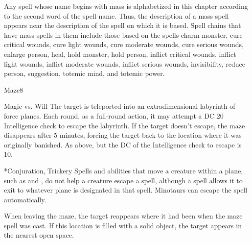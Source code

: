 \par Any spell whose name begins with mass is alphabetized in this chapter according to the second word of the spell name. Thus, the description of a mass spell appears near the description of the spell on which it is based. Spell chains that have mass spells in them include those based on the spells charm monster, cure critical wounds, cure light wounds, cure moderate wounds, cure serious wounds, enlarge person, heal, hold monster, hold person, inflict critical wounds, inflict light wounds, inflict moderate wounds, inflict serious wounds, invisibility, reduce person, suggestion, totemic mind, and totemic power.

\begin{spellsection}{Maze}{8}
    \begin{spellheader}
    \end{spellheader}
    \begin{spellcontent}
        \begin{spelltargetinginfo}
        \end{spelltargetinginfo}
        \begin{spelleffects}
            \begin{spellattack}{Magic vs. Will}
                \spellsuccess The target is teleported into an extradimensional labyrinth of force planes. Each round, as a full-round action, it may attempt a DC 20 Intelligence check to escape the labyrinth. If the target doesn't escape, the maze disappears after 5 minutes, forcing the target back to the location where it was originally banished.
                \spellfailure As above, but the DC of the Intelligence check to escape is 10.
            \end{spellattack}
        \end{spelleffects}
    \end{spellcontent}
    \begin{spellfooter}
        *{Conjuration, Trickery}
        \spellnotes Spells and abilities that move a creature within a plane, such as  and , do not help a creature escape a  spell, although a  spell allows it to exit to whatever plane is designated in that spell. Minotaurs can escape the spell automatically.

        When leaving the maze, the target reappears where it had been when the maze spell was cast. If this location is filled with a solid object, the target appears in the nearest open space.

        \norepeatspellnotes
        \miscastrandom
    \end{spellfooter}
\end{spellsection}

